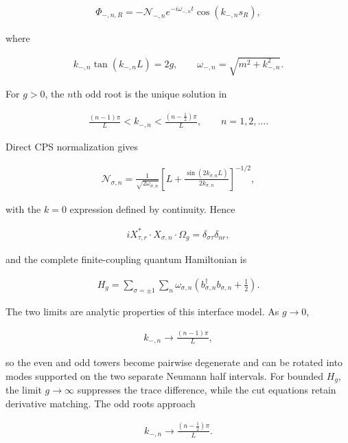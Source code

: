 \begin{align}
\Phi_{-,n,R}
=-\mathcal N_{-,n}e^{-i\omega_{-,n}t}
\cos(k_{-,n}s_R),
\end{align}

where

\begin{align}
k_{-,n}\tan(k_{-,n}L)=2g,
\qquad
\omega_{-,n}=\sqrt{m^2+k_{-,n}^2}.
\end{align}

For $g>0$, the $n$th odd root is the unique solution in

\begin{align}
\frac{(n-1)\pi}{L}
<k_{-,n}<
\frac{(n-\frac12)\pi}{L},
\qquad
n=1,2,\ldots.
\end{align}

Direct CPS normalization gives

\begin{align}
\mathcal N_{\sigma,n}
=\frac{1}{\sqrt{2\omega_{\sigma,n}}}
\left[
L+\frac{\sin(2k_{\sigma,n}L)}{2k_{\sigma,n}}
\right]^{-1/2},
\end{align}

with the $k=0$ expression defined by continuity. Hence

\begin{align}
iX_{\tau,r}^*\mathbin{\cdot}X_{\sigma,n}\mathbin{\cdot}\Omega_g
=\delta_{\sigma\tau}\delta_{nr},
\end{align}

and the complete finite-coupling quantum Hamiltonian is

\begin{align}
H_g
=\sum_{\sigma=\pm1}\sum_n
\omega_{\sigma,n}
\left(b_{\sigma,n}^\dagger b_{\sigma,n}+\frac12\right).
\end{align}

The two limits are analytic properties of this interface model. As $g\to0$,

\begin{align}
k_{-,n}\longrightarrow\frac{(n-1)\pi}{L},
\end{align}

so the even and odd towers become pairwise degenerate and can be rotated into modes supported on the two separate Neumann half intervals. For bounded $H_g$, the limit $g\to\infty$ suppresses the trace difference, while the cut equations retain derivative matching. The odd roots approach

\begin{align}
k_{-,n}\longrightarrow\frac{(n-\frac12)\pi}{L}.
\end{align}

